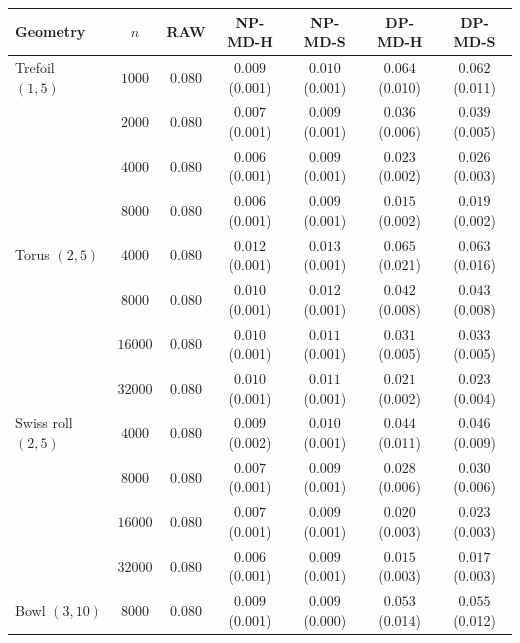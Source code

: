 \begin{tabular}{lcccccc}
\toprule
Geometry & $n$ & RAW & NP-MD-H & NP-MD-S & DP-MD-H & DP-MD-S \\
\midrule
Trefoil $(1,5)$ & $1000$ & $0.080$ & $0.009$ \scriptsize(0.001) & $0.010$ \scriptsize(0.001) & $0.064$ \scriptsize(0.010) & $0.062$ \scriptsize(0.011) \\
 & $2000$ & $0.080$ & $0.007$ \scriptsize(0.001) & $0.009$ \scriptsize(0.001) & $0.036$ \scriptsize(0.006) & $0.039$ \scriptsize(0.005) \\
 & $4000$ & $0.080$ & $0.006$ \scriptsize(0.001) & $0.009$ \scriptsize(0.001) & $0.023$ \scriptsize(0.002) & $0.026$ \scriptsize(0.003) \\
 & $8000$ & $0.080$ & $0.006$ \scriptsize(0.001) & $0.009$ \scriptsize(0.001) & $0.015$ \scriptsize(0.002) & $0.019$ \scriptsize(0.002) \\
\midrule
Torus $(2,5)$ & $4000$ & $0.080$ & $0.012$ \scriptsize(0.001) & $0.013$ \scriptsize(0.001) & $0.065$ \scriptsize(0.021) & $0.063$ \scriptsize(0.016) \\
 & $8000$ & $0.080$ & $0.010$ \scriptsize(0.001) & $0.012$ \scriptsize(0.001) & $0.042$ \scriptsize(0.008) & $0.043$ \scriptsize(0.008) \\
 & $16000$ & $0.080$ & $0.010$ \scriptsize(0.001) & $0.011$ \scriptsize(0.001) & $0.031$ \scriptsize(0.005) & $0.033$ \scriptsize(0.005) \\
 & $32000$ & $0.080$ & $0.010$ \scriptsize(0.001) & $0.011$ \scriptsize(0.001) & $0.021$ \scriptsize(0.002) & $0.023$ \scriptsize(0.004) \\
\midrule
Swiss roll $(2,5)$ & $4000$ & $0.080$ & $0.009$ \scriptsize(0.002) & $0.010$ \scriptsize(0.001) & $0.044$ \scriptsize(0.011) & $0.046$ \scriptsize(0.009) \\
 & $8000$ & $0.080$ & $0.007$ \scriptsize(0.001) & $0.009$ \scriptsize(0.001) & $0.028$ \scriptsize(0.006) & $0.030$ \scriptsize(0.006) \\
 & $16000$ & $0.080$ & $0.007$ \scriptsize(0.001) & $0.009$ \scriptsize(0.001) & $0.020$ \scriptsize(0.003) & $0.023$ \scriptsize(0.003) \\
 & $32000$ & $0.080$ & $0.006$ \scriptsize(0.001) & $0.009$ \scriptsize(0.001) & $0.015$ \scriptsize(0.003) & $0.017$ \scriptsize(0.003) \\
\midrule
Bowl $(3,10)$ & $8000$ & $0.080$ & $0.009$ \scriptsize(0.001) & $0.009$ \scriptsize(0.000) & $0.053$ \scriptsize(0.014) & $0.055$ \scriptsize(0.012) \\

\end{tabular}
